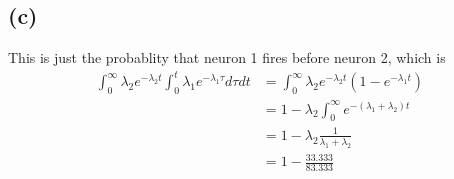 \documentclass[12pt]{article}
\begin{document}
\subsection*{(c)}
This is just the probablity that neuron 1 fires before
neuron 2, which is 
\begin{align*}
    \int_{0}^{\infty}\lambda_2e^{-\lambda_2 t}\int_{0}^{t}\lambda_1e^{-\lambda_1 \tau}d\tau dt
    &=\int_{0}^{\infty}\lambda_2e^{-\lambda_2 t}(1-e^{-\lambda_1 t})\\
    &=1-\lambda_2\int_{0}^{\infty}e^{-(\lambda_1+\lambda_2) t}\\
    &=1-\lambda_2\frac{1}{\lambda_1+\lambda_2}\\
    &=\boxed{1-\frac{33.333}{83.333}}
\end{align*}
\end{document}
